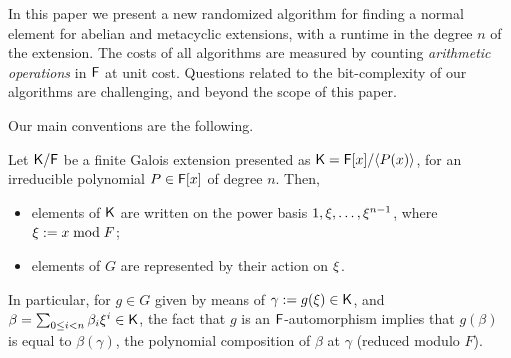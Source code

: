 In this paper we present a new randomized algorithm for finding a normal
element for abelian and metacyclic extensions, with a runtime \alg
in the degree $n$ of the extension. The costs of all algorithms are
measured by counting \emph{arithmetic operations} in ${\mathsf{F}}$ at unit cost.
Questions related to the bit-complexity of our algorithms are challenging,
and beyond the scope of this paper.

Our main conventions are the following.
\begin{assumption}
  \label{assum}
  Let ${\mathsf{K}}/{\mathsf{F}}$ be a finite Galois extension presented as
  ${\mathsf{K}}={\mathsf{F}}[x]/\langle P(x)\rangle$, for an irreducible polynomial $P\in
  {\mathsf{F}}[x]$ of degree $n$. Then,
  \begin{itemize}
  \item elements of ${\mathsf{K}}$ are written on the power basis $1,\xi,\dots,\xi^{n-1}$,
    where $\xi := x \bmod F$;
  \item elements of $G$ are represented by their action on $\xi$.
  \end{itemize}
\end{assumption}

In particular, for $g \in G$ given by means of $\gamma:=g(\xi) \in {\mathsf{K}}$,
and $\beta = \sum_{0\leq i<n}\beta_i\xi^i\in{\mathsf{K}}$, the fact that $g$ is an
${\mathsf{F}}$-automorphism implies that $g(\beta)$ is equal to $\beta(\gamma)$, the
polynomial composition of $\beta$ at $\gamma$ (reduced modulo $F$).


